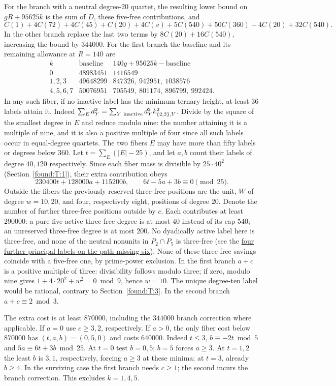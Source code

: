\documentclass[11pt,a4paper]{article}
\numberwithin{equation}{section}
\theoremstyle{remark}
\begin{document}
For the branch with a neutral degree-$20$ quartet, the resulting lower bound on $gR+95625k$ is the sum of $D$, these five-free contributions, and
\[
 C(1)+4C(72)+4C(45)+C(20)+4C(v)+5C(540)
                  +50C(360)+4C(20)+32C(540).
\]
In the other branch replace the last two terms by $8C(20)+16C(540)$, increasing the bound by $344000$. For the first branch the baseline and its remaining allowance at $R=140$ are
\[
\begin{array}{c|r|r}
 k & \text{baseline} & 140g+95625k-\text{baseline}\\\hline
 0&48983451&1416549\\
 1,2,3&49648299&847326,\ 942951,\ 1038576\\
 4,5,6,7&50076951&705549,\ 801174,\ 896799,\ 992424 .
\end{array}
\]
In any such fiber, if no inactive label has the minimum ternary height, at least $36$ labels attain it. Indeed $\sum_Ed_Y^2=\sum_{Y\ {\rm inactive}}d_Y^2k_{\{2,3\},Y}^2$. Divide by the square of the smallest degree in $E$ and reduce modulo nine: the number attaining it is a multiple of nine, and it is also a positive multiple of four since all such labels occur in equal-degree quartets. The two fibers $E$ may have more than fifty labels or degrees below $360$. Let $t=\sum_E(|E|-25)$, and let $a,b$ count their labels of degree $40,120$ respectively. Since each fiber mass is divisible by $25\cdot40^2$ (Section~\ref{found:T:1}), their extra contribution obeys
\[
      230400t+128000a+115200b,\qquad 6t-5a+3b\equiv0\pmod{25}.
\]
Outside the fibers the previously reserved three-free positions are the unit, $W$ of degree $w=10,20$, and four, respectively eight, positions of degree $20$. Denote the number of further three-free positions outside by $c$. Each contributes at least $290000$: a pure five-active three-free degree is at most $40$ instead of its cap $540$; an unreserved three-free degree is at most $200$. No dyadically active label here is three-free, and none of the neutral nonunits in $P_2\cap P_5$ is three-free (see the \hyperref[por:four-neutral]{four further principal labels on the path missing six}). None of these three-free savings coincide with a five-free one, by prime-power exclusion. In the first branch $a+c$ is a positive multiple of three: divisibility follows modulo three; if zero, modulo nine gives $1+4\cdot20^2+w^2=0\bmod9$, hence $w=10$. The unique degree-ten label would be rational, contrary to Section~\ref{found:T:3}. In the second branch $a+c\equiv2\bmod3$.

The extra cost is at least $870000$, including the $344000$ branch correction where applicable. If $a=0$ use $c\ge3,2$, respectively. If $a>0$, the only fiber cost below $870000$ has $(t,a,b)=(0,5,0)$ and costs $640000$. Indeed $t\le3$, $b\equiv-2t\bmod5$ and $5a\equiv6t+3b\bmod25$. At $t=0$ test $b=0,5$; $b=5$ forces $a\ge3$. At $t=1,2$ the least $b$ is $3,1$, respectively, forcing $a\ge3$ at these minima; at $t=3$, already $b\ge4$. In the surviving case the first branch needs $c\ge1$; the second incurs the branch correction. This excludes $k=1,4,5$.
\end{document}
